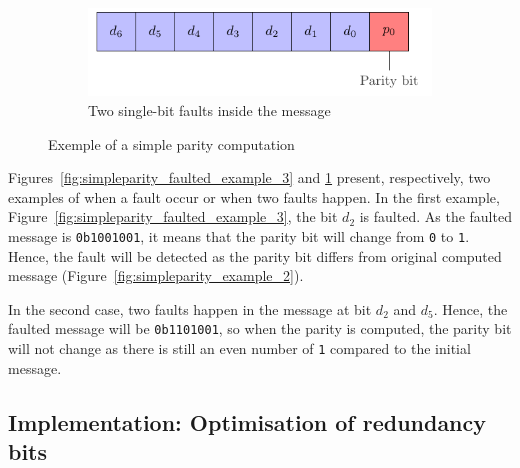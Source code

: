 \begin{figure}[ht]
\begin{subfigure}[b]{0.49\textwidth}
        \includegraphics[width=\textwidth, page=5]{c5_countermeasures_dift/img/simple_parity.pdf}
        \caption{Two single-bit faults inside the message}
        \label{fig:simpleparity_faulted_example_4}
    \end{subfigure}
    \caption{Exemple of a simple parity computation}
    \label{fig:simpleparity_example}
\end{figure}

Figures~\ref{fig:simpleparity_faulted_example_3} and \ref{fig:simpleparity_faulted_example_4} present, respectively, two examples of when a fault occur or when two faults happen. In the first example, Figure~\ref{fig:simpleparity_faulted_example_3}, the bit $d_2$ is faulted.
As the faulted message is \texttt{0b1001001}, it means that the parity bit will change from \texttt{0} to \texttt{1}. Hence, the fault will be detected as the parity bit differs from original computed message (Figure~\ref{fig:simpleparity_example_2}).

In the second case, two faults happen in the message at bit $d_2$ and $d_5$. Hence, the faulted message will be \texttt{0b1101001}, so when the parity is computed, the parity bit will not change as there is still an even number of \texttt{1} compared to the initial message.

\subsection{Implementation: Optimisation of redundancy bits}

